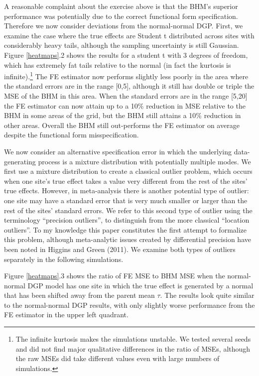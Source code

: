 \documentclass[12pt]{article}
\begin{document}
A reasonable complaint about the exercise above is that the BHM's superior performance was potentially due to the correct functional form specification. Therefore we now consider deviations from the normal-normal DGP. First, we examine the case where the true effects are Student t distributed across sites with considerably heavy tails, although the sampling uncertainty is still Gaussian. Figure \ref{heatmaps}.2 shows the results for a student t with 3 degrees of freedom, which has extremely fat tails relative to the normal (in fact the kurtosis is infinite).\footnote{The infinite kurtosis makes the simulations unstable. We tested several seeds and did not find major qualitative differences in the ratio of MSEs, although the raw MSEs did take different values even with large numbers of simulations.} The FE estimator now performs slightly less poorly in the area where the standard errors are in the range [0,5], although it still has double or triple the MSE of the BHM in this area. When the standard errors are in the range [5,20] the FE estimator can now attain up to a 10\% reduction in MSE relative to the BHM in some areas of the grid, but the BHM still attains a 10\% reduction in other areas. Overall the BHM still out-performs the FE estimator on average despite the functional form misspecification.

We now consider an alternative specification error in which the underlying data-generating process is a mixture distribution with potentially multiple modes. We first use a mixture distribution to create a classical outlier problem, which occurs when one site's true effect takes a value very different from the rest of the sites' true effects. However, in meta-analysis there is another potential type of outlier: one site may have a standard error that is very much smaller or larger than the rest of the sites' standard errors. We refer to this second type of outlier using the terminology ``precision outliers'', to distinguish from the more classical ``location outliers''. To my knowledge this paper constitutes the first attempt to formalize this problem, although meta-analytic issues created by differential precision have been noted in Higgins and Green (2011). We examine both types of outliers separately in the following simulations. 

Figure \ref{heatmaps}.3 shows the ratio of FE MSE to BHM MSE when the normal-normal DGP model has one site in which the true effect is generated by a normal that has been shifted away from the parent mean $\tau$. The results look quite similar to the normal-normal DGP results, with only slightly worse performance from the FE estimator in the upper left quadrant.
\end{document}
